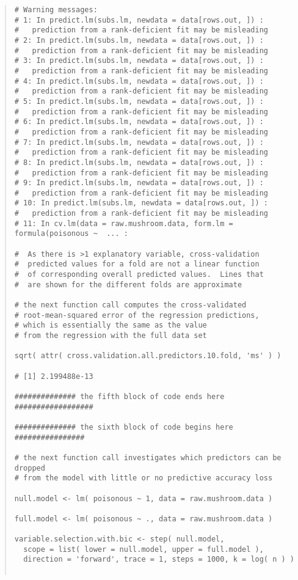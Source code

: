 \documentclass[12pt]{article}
\begin{document}
\begin{quote}
\begin{verbatim}
# Warning messages:
# 1: In predict.lm(subs.lm, newdata = data[rows.out, ]) :
#   prediction from a rank-deficient fit may be misleading
# 2: In predict.lm(subs.lm, newdata = data[rows.out, ]) :
#   prediction from a rank-deficient fit may be misleading
# 3: In predict.lm(subs.lm, newdata = data[rows.out, ]) :
#   prediction from a rank-deficient fit may be misleading
# 4: In predict.lm(subs.lm, newdata = data[rows.out, ]) :
#   prediction from a rank-deficient fit may be misleading
# 5: In predict.lm(subs.lm, newdata = data[rows.out, ]) :
#   prediction from a rank-deficient fit may be misleading
# 6: In predict.lm(subs.lm, newdata = data[rows.out, ]) :
#   prediction from a rank-deficient fit may be misleading
# 7: In predict.lm(subs.lm, newdata = data[rows.out, ]) :
#   prediction from a rank-deficient fit may be misleading
# 8: In predict.lm(subs.lm, newdata = data[rows.out, ]) :
#   prediction from a rank-deficient fit may be misleading
# 9: In predict.lm(subs.lm, newdata = data[rows.out, ]) :
#   prediction from a rank-deficient fit may be misleading
# 10: In predict.lm(subs.lm, newdata = data[rows.out, ]) :
#   prediction from a rank-deficient fit may be misleading
# 11: In cv.lm(data = raw.mushroom.data, form.lm = formula(poisonous ~  ... : 

#  As there is >1 explanatory variable, cross-validation
#  predicted values for a fold are not a linear function
#  of corresponding overall predicted values.  Lines that
#  are shown for the different folds are approximate

# the next function call computes the cross-validated
# root-mean-squared error of the regression predictions,
# which is essentially the same as the value
# from the regression with the full data set

sqrt( attr( cross.validation.all.predictors.10.fold, 'ms' ) )

# [1] 2.199488e-13

############## the fifth block of code ends here ##################

############## the sixth block of code begins here ################

# the next function call investigates which predictors can be dropped
# from the model with little or no predictive accuracy loss

null.model <- lm( poisonous ~ 1, data = raw.mushroom.data )

full.model <- lm( poisonous ~ ., data = raw.mushroom.data )

variable.selection.with.bic <- step( null.model,
  scope = list( lower = null.model, upper = full.model ), 
  direction = 'forward', trace = 1, steps = 1000, k = log( n ) )


\end{verbatim}
\end{quote}
\end{document}
